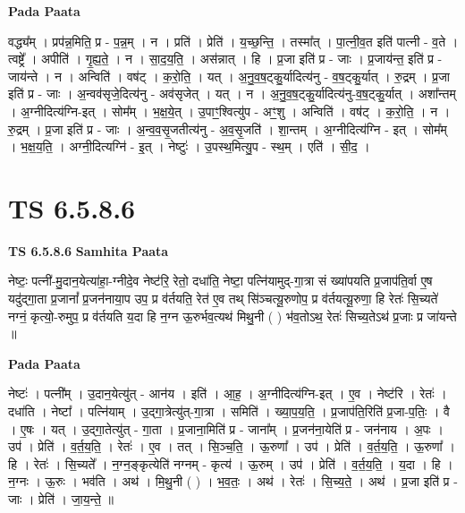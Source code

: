 \documentclass[17pt]{extarticle}
\begin{document}
\textbf{Pada Paata} \newline

वद्ध्य᳚म् । प्रप॑न्न॒मिति॒ प्र - प॒न्न॒म् । न । प्रति॑ । प्रेति॑ । य॒च्छ॒न्ति॒ । तस्मा᳚त् । पा॒त्नी॒व॒त इति॑ पात्नी - व॒ते । त्वष्ट्रे᳚ । अपीति॑ । गृ॒ह्य॒ते॒ । न । सा॒द॒य॒ति॒ । अस॑न्नात् । हि । प्र॒जा इति॑ प्र - जाः । प्र॒जाय॑न्त॒ इति॑ प्र - जाय॑न्ते । न । अन्विति॑ । वष॑ट् । क॒रो॒ति॒ । यत् । अ॒नु॒व॒ष॒ट्कु॒र्यादित्य॑नु - व॒ष॒ट्कु॒र्यात् । रु॒द्रम् । प्र॒जा इति॑ प्र - जाः । अ॒न्वव॑सृजे॒दित्य॑नु - अव॑सृजेत् । यत् । न । अ॒नु॒व॒ष॒ट्कु॒र्यादित्य॑नु-व॒ष॒ट्कु॒र्यात् । अशा᳚न्तम् । अ॒ग्नीदित्य॑ग्नि-इत् । सोम᳚म् । भ॒क्ष॒ये॒त् ।  उ॒पाꣳ॒॒श्वित्यु॑प - अꣳ॒॒शु । अन्विति॑ । वष॑ट् । क॒रो॒ति॒ । न । रु॒द्रम् । प्र॒जा इति॑ प्र - जाः । अ॒न्व॒व॒सृ॒जतीत्य॑नु - अ॒व॒सृ॒जति॑ । शा॒न्तम् । अ॒ग्नीदित्य॑ग्नि - इत् । सोम᳚म् । भ॒क्ष॒य॒ति॒ । अग्नी॒दित्यग्नि॑ - इ॒त् । नेष्टुः॑ । उ॒पस्थ॒मित्यु॒प - स्थ॒म् । एति॑ । सी॒द॒ ।  \newline




\section*{ TS 6.5.8.6 }

\textbf{TS 6.5.8.6 } \newline
\textbf{Samhita Paata} \newline

नेष्टः॒ पत्नी॑-मु॒दान॒येत्या॑हा॒-ग्नीदे॒व नेष्ट॑रि॒ रेतो॒ दधा॑ति॒ नेष्टा॒ पत्नि॑यामुद्-गा॒त्रा सं ख्या॑पयति प्र॒जाप॑ति॒र्वा ए॒ष यदु॑द्गा॒ता प्र॒जानां᳚ प्र॒जन॑नाया॒प उप॒ प्र व॑र्तयति॒ रेत॑ ए॒व तथ् सि॑ञ्चत्यू॒रुणोप॒ प्र व॑र्तयत्यू॒रुणा॒ हि रेतः॑ सि॒च्यते॑ नग्नं॒ कृत्यो॒-रुमुप॒ प्र व॑र्तयति य॒दा हि न॒ग्न ऊ॒रुर्भव॒त्यथ॑ मिथु॒नी ( ) भ॑व॒तोऽथ॒ रेतः॑ सिच्य॒तेऽथ॑ प्र॒जाः प्र जा॑यन्ते ॥ \newline

\textbf{Pada Paata} \newline

नेष्टः॑ । पत्नी᳚म् । उ॒दान॒येत्यु॑त् - आन॑य । इति॑ । आ॒ह॒ । अ॒ग्नीदित्य॑ग्नि-इत् । ए॒व । नेष्ट॑रि । रेतः॑ । दधा॑ति । नेष्टा᳚ । पत्नि॑याम् । उ॒द्गा॒त्रेत्यु॑त्-गा॒त्रा । समिति॑ । ख्या॒प॒य॒ति॒ । प्र॒जाप॑ति॒रिति॑ प्र॒जा-प॒तिः॒ । वै । ए॒षः । यत् । उ॒द्गा॒तेत्यु॑त् - गा॒ता । प्र॒जाना॒मिति॑ प्र - जाना᳚म् । प्र॒जन॑ना॒येति॑ प्र - जन॑नाय । अ॒पः । उप॑ । प्रेति॑ । व॒र्त॒य॒ति॒ । रेतः॑ । ए॒व । तत् । सि॒ञ्च॒ति॒ । ऊ॒रुणा᳚ । उप॑ । प्रेति॑ । व॒र्त॒य॒ति॒ । ऊ॒रुणा᳚ । हि । रेतः॑ । सि॒च्यते᳚ । न॒ग्न॒ङ्कृत्येति॑ नग्नम् - कृत्य॑ । ऊ॒रुम् । उप॑ । प्रेति॑ । व॒र्त॒य॒ति॒ । य॒दा । हि । न॒ग्नः । ऊ॒रुः । भव॑ति । अथ॑ । मि॒थु॒नी ( ) । भ॒व॒तः॒ । अथ॑ । रेतः॑ । सि॒च्य॒ते॒ । अथ॑ । प्र॒जा इति॑ प्र - जाः । प्रेति॑ । जा॒य॒न्ते॒ ॥  \newline
\end{document}
